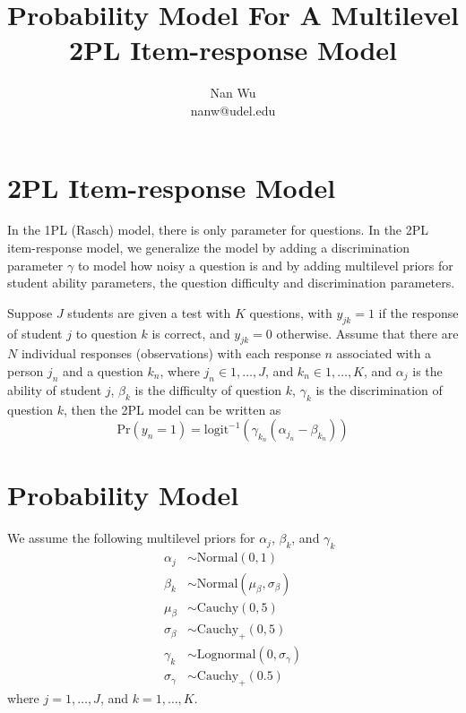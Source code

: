 \documentclass[12pt]{article}
\begin{document}
\title{Probability Model For A Multilevel 2PL Item-response Model}
\author{Nan Wu \\ nanw@udel.edu}
\date{}
\maketitle

\section{2PL Item-response Model}

In the 1PL (Rasch) model, there is only parameter for questions. In the 2PL item-response model, we generalize the model by adding a discrimination parameter $\gamma$ to model how noisy a question is and by adding multilevel priors for student ability parameters, the question difficulty and discrimination parameters. 

Suppose $J$ students are given a test with $K$ questions, with $y_{jk}=1$ if the response of student $j$ to question $k$ is correct, and  $y_{jk}=0$ otherwise. Assume that there are $N$ individual responses (observations) with each response $n$ associated with a person $j_n$ and a question $k_n$, where $j_n\in{1,\ldots, J}$, and $k_n\in{1, \ldots, K}$, and $\alpha_j$ is the ability of student $j$, $\beta_k$ is the difficulty of question $k$, $\gamma_k$ is the discrimination of question $k$, then the 2PL model can be written as
\begin{equation} \label{eq:1}
  \mathrm{Pr}\left(y_n=1\right)=\mathrm{logit}^{-1}\left(\gamma_{k_n}\left(\alpha_{j_n} - \beta_{k_n}\right)\right)
\end{equation}

\section{Probability Model}

We assume the following multilevel priors for $\alpha_j$, $\beta_k$, and $\gamma_k$
\begin{align*}
  \alpha_j &\sim \mathrm{Normal}\left(0,1\right)\\
  \beta_k &\sim \mathrm{Normal} \left(\mu_\beta, \sigma_\beta\right)\\
  \mu_\beta &\sim \mathrm{Cauchy} \left(0, 5 \right) \\
  \sigma_\beta &\sim \mathrm{Cauchy}_+ \left(0, 5 \right) \\
  \gamma_k &\sim \mathrm{Lognormal} \left(0, \sigma_\gamma \right) \\
  \sigma_\gamma &\sim \mathrm{Cauchy}_+ \left(0. 5 \right)
\end{align*}
where $j=1, \ldots, J$, and $k=1, \ldots, K$.
\end{document}
